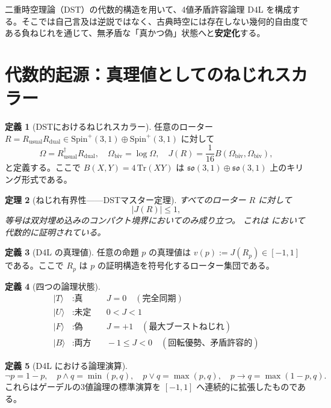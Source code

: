\documentclass[dvipdfmx,11pt,a4paper]{article}
\newtheorem{theorem}{定理}[section]
\theoremstyle{definition}
\newtheorem{definition}[theorem]{定義}
\begin{document}
二重時空理論（DST）の代数的構造を用いて、4値矛盾許容論理 D4L を構成する。そこでは自己言及は逆説ではなく、古典時空には存在しない幾何的自由度である負ねじれを通じて、無矛盾な「真かつ偽」状態へと\textbf{安定化}する。

\section{代数的起源：真理値としてのねじれスカラー}

\begin{definition}[DSTにおけるねじれスカラー]
任意のローター $R = R_\text{usual} R_\text{dual} \in \mathrm{Spin}^+(3,1)\oplus\mathrm{Spin}^+(3,1)$ に対して
\[
\Omega = R_\text{usual}^\dagger R_\text{dual},\quad
\Omega_\text{biv} = \log\Omega,\quad
J(R) = \frac{1}{16} B(\Omega_\text{biv},\Omega_\text{biv}),
\]
と定義する。ここで $B(X,Y)=4\,\mathrm{Tr}(XY)$ は $\mathfrak{so}(3,1)\oplus\mathfrak{so}(3,1)$ 上のキリング形式である。
\end{definition}

\begin{theorem}[ねじれ有界性——DSTマスター定理]
すべてのローター $R$ に対して
\[
|J(R)| \leq 1,
\]
等号は双対埋め込みのコンパクト境界においてのみ成り立つ。
これは \cite{DST2025} において代数的に証明されている。
\end{theorem}

\begin{definition}[D4L の真理値]
任意の命題 $p$ の真理値は $v(p) := J(R_p) \in [-1,1]$ である。ここで $R_p$ は $p$ の証明構造を符号化するローター集団である。
\end{definition}

\begin{definition}[四つの論理状態]
\begin{align*}
\vert T\rangle &: \text{真} &\quad J=0 \quad (\text{完全同期}) \\
\vert U\rangle &: \text{未定} &\quad 0 < J < 1 \\
\vert F\rangle &: \text{偽} &\quad J = +1 \quad (\text{最大ブーストねじれ}) \\
\vert B\rangle &: \text{両方} &\quad -1 \leq J < 0 \quad (\text{回転優勢、矛盾許容的})
\end{align*}
\end{definition}

\begin{definition}[D4L における論理演算]
\[
\neg p = 1-p, \quad
p \wedge q = \min(p,q), \quad
p \vee q = \max(p,q), \quad
p \to q = \max(1-p,q).
\]
これらはゲーデルの3値論理の標準演算を $[-1,1]$ へ連続的に拡張したものである。
\end{definition}
\end{document}
